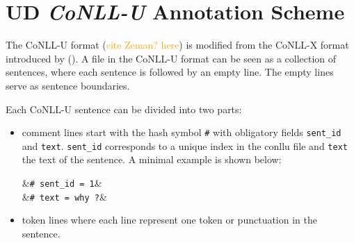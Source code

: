 \newcommand{\conllu}[1]{&\footnotesize\texttt{#1}}
\newcommand{\tab}{&\hspace{0.1em}}
\setlength{\abovedisplayskip}{3pt}
\setlength{\belowdisplayskip}{3pt}
\vspace{-1em}
\section{UD \emph{CoNLL-U} Annotation Scheme}\label{sec:conllu}

The CoNLL-U format (\textcolor{orange}{cite Zeman? here}) is modified from the CoNLL-X format introduced by (\cite{buchholz-marsi-2006-conll}). A file in the CoNLL-U format can be seen as a collection of sentences, where each sentence is followed by an empty line. The empty lines serve as sentence boundaries.

Each CoNLL-U sentence can be divided into two parts:
\begin{itemize}
	\item comment lines  start with the hash symbol \texttt{\#} with obligatory fields \texttt{sent\_id} and \texttt{text}. \texttt{sent\_id} corresponds to a unique index in the conllu file and \texttt{text} the text of the sentence. A minimal example is shown below:
	\begin{flalign*}
	\conllu{\# sent\_id = 1}&\\
	\conllu{\# text = why ?}&
	\end{flalign*}
	\item token lines where each line represent one token or punctuation in the sentence.
\end{itemize}

